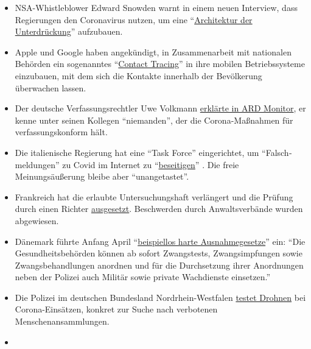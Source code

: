 \begin{itemize}
\tightlist
\item
  NSA-Whistleblower Edward Snowden warnt in einem neuen Interview, dass
  Regierungen den Coronavirus nutzen, um eine
  ``\href{https://www.vice.com/en_us/article/bvge5q/snowden-warns-governments-are-using-coronavirus-to-build-the-architecture-of-oppression}{Architektur
  der Unterdrückung}'' aufzubauen.
\item
  Apple und Google haben angekündigt, in Zusammenarbeit mit nationalen
  Behörden ein sogenanntes
  ``\href{https://www.bloomberg.com/news/articles/2020-04-10/apple-google-bring-covid-19-contact-tracing-to-3-billion-people}{Contact
  Tracing}'' in ihre mobilen Betriebssysteme einzubauen, mit dem sich
  die Kontakte innerhalb der Bevölkerung überwachen lassen.
\item
  Der deutsche Verfassungsrechtler Uwe Volkmann
  \href{https://www.youtube.com/watch?v=DvzrGLvzllU}{erklärte in ARD
  Monitor}, er kenne unter seinen Kollegen ``niemanden'', der die
  Corona-Maßnahmen für verfassungskonform hält.
\item
  Die italienische Regierung hat eine ``Task Force'' eingerichtet, um
  ``Falsch­meldungen'' zu Covid im Internet zu
  ``\href{https://www.faz.net/aktuell/feuilleton/medien/corona-in-italien-das-virus-und-die-wahrheit-16714529.html}{beseitigen}''
  . Die freie Meinungsäußerung bleibe aber ``unangetastet''.
\item
  Frankreich hat die erlaubte Untersuchungshaft verlängert und die
  Prüfung durch einen Richter
  \href{https://www.lefigaro.fr/politique/coronavirus-le-conseil-d-etat-sur-la-ligne-de-crete-des-libertes-publiques-20200406}{ausgesetzt}.
  Beschwerden durch Anwaltsverbände wurden abgewiesen.
\item
  Dänemark führte Anfang April
  ``\href{https://www.fr.de/politik/coronavirus-sars-cov-2-daenemark-notfalls-militaer-13598503.html}{beispiellos
  harte Ausnahmegesetze}'' ein: ``Die Gesundheits­behörden können ab
  sofort Zwangstests, Zwangs­impfungen sowie Zwangs­behandlungen
  anordnen und für die Durchsetzung ihrer Anordnungen neben der Polizei
  auch Militär sowie private Wachdienste einsetzen.''
\item
  Die Polizei im deutschen Bundesland Nordrhein-Westfalen
  \href{https://rp-online.de/nrw/panorama/nrw-polizei-testet-drohnen-bei-einsaetzen-wegen-corona-massnahmen_aid-50006143}{testet
  Drohnen} bei Corona-Einsätzen, konkret zur Suche nach verbotenen
  Menschenansammlungen.
\item

\end{itemize}
